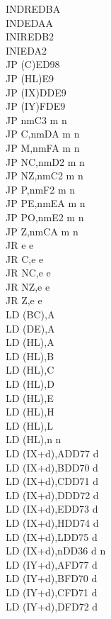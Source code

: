 \documentclass[12pt,twoside,openright,a4paper]{book}
\begin{document}
\begin{multicols}{3}
{\begin{tabbing}
		INDR\>EDBA\\
		IND\>EDAA\\
		INIR\>EDB2\\
		INI\>EDA2\\
		JP (C)\ZXN\>ED98\\
		JP (HL)\>E9\\
		JP (IX)\>DDE9\\
		JP (IY)\>FDE9\\
		JP nm\>C3 m n\\
		JP C,nm\>DA m n\\
		JP M,nm\>FA m n\\
		JP NC,nm\>D2 m n\\
		JP NZ,nm\>C2 m n\\
		JP P,nm\>F2 m n\\
		JP PE,nm\>EA m n\\
		JP PO,nm\>E2 m n\\
		JP Z,nm\>CA m n\\
		JR e e\\
		JR C,e e\\
		JR NC,e e\\
		JR NZ,e e\\
		JR Z,e e\\
		LD (BC),A\\
		LD (DE),A\\
		LD (HL),A\\
		LD (HL),B\\
		LD (HL),C\\
		LD (HL),D\\
		LD (HL),E\\
		LD (HL),H\\
		LD (HL),L\\
		LD (HL),n n\\
		LD (IX+d),A\>DD77 d\\
		LD (IX+d),B\>DD70 d\\
		LD (IX+d),C\>DD71 d\\
		LD (IX+d),D\>DD72 d\\
		LD (IX+d),E\>DD73 d\\
		LD (IX+d),H\>DD74 d\\
		LD (IX+d),L\>DD75 d\\
		LD (IX+d),n\>DD36 d n\\
		LD (IY+d),A\>FD77 d\\
		LD (IY+d),B\>FD70 d\\
		LD (IY+d),C\>FD71 d\\
		LD (IY+d),D\>FD72 d\\

\end{tabbing}}
\end{multicols}
\end{document}
